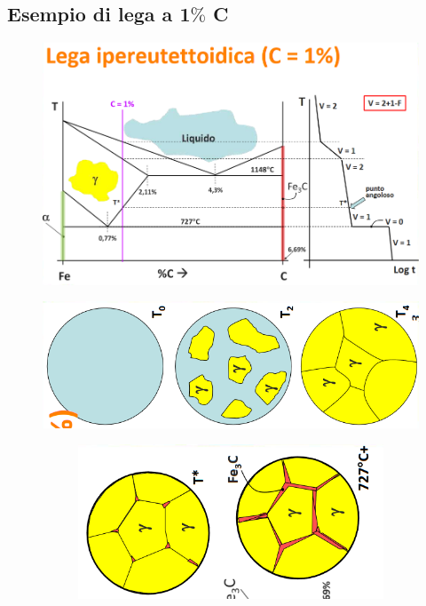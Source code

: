 \documentclass{article}
\begin{document}
{        \subsection{Esempio di lega a 1$\%$ C}
            \begin{figure}[h!]
                \centering
                \includegraphics[width=.8\linewidth]{L13 - Curva di Stato per Accaio a C = 1.png}
            \end{figure}
            \begin{figure}[h!]
                \centering
                \includegraphics[width=.8\linewidth]{L13 - Cambio di struttura prima del eutettoidico.png}
            \end{figure}
            \begin{figure}
                \centering
                \begin{subfigure}[h!]{0.6\linewidth}
                    \includegraphics[width=\linewidth]{L13 - Cambio di struttura durante lo smiscelamento della cementite a C = 1.png}

\end{subfigure}
\end{figure}}
\end{document}
